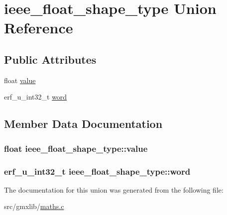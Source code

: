 \hypertarget{unionieee__float__shape__type}{\section{ieee\-\_\-float\-\_\-shape\-\_\-type \-Union \-Reference}
\label{unionieee__float__shape__type}
}
\subsection*{\-Public \-Attributes}
\begin{DoxyCompactItemize}
\item 
float \hyperlink{unionieee__float__shape__type_aa0c47451f1b974421cbb9e2833ddb68e}{value}
\item 
erf\-\_\-u\-\_\-int32\-\_\-t \hyperlink{unionieee__float__shape__type_a82841ac8cf678aef345774ad73c98f32}{word}
\end{DoxyCompactItemize}


\subsection{\-Member \-Data \-Documentation}
\hypertarget{unionieee__float__shape__type_aa0c47451f1b974421cbb9e2833ddb68e}{
\subsubsection[{value}]{\setlength{\rightskip}{0pt plus 5cm}float {\bf ieee\-\_\-float\-\_\-shape\-\_\-type\-::value}}}\label{unionieee__float__shape__type_aa0c47451f1b974421cbb9e2833ddb68e}
\hypertarget{unionieee__float__shape__type_a82841ac8cf678aef345774ad73c98f32}{
\subsubsection[{word}]{\setlength{\rightskip}{0pt plus 5cm}erf\-\_\-u\-\_\-int32\-\_\-t {\bf ieee\-\_\-float\-\_\-shape\-\_\-type\-::word}}}\label{unionieee__float__shape__type_a82841ac8cf678aef345774ad73c98f32}


\-The documentation for this union was generated from the following file\-:\begin{DoxyCompactItemize}
\item 
src/gmxlib/\hyperlink{maths_8c}{maths.\-c}\end{DoxyCompactItemize}
